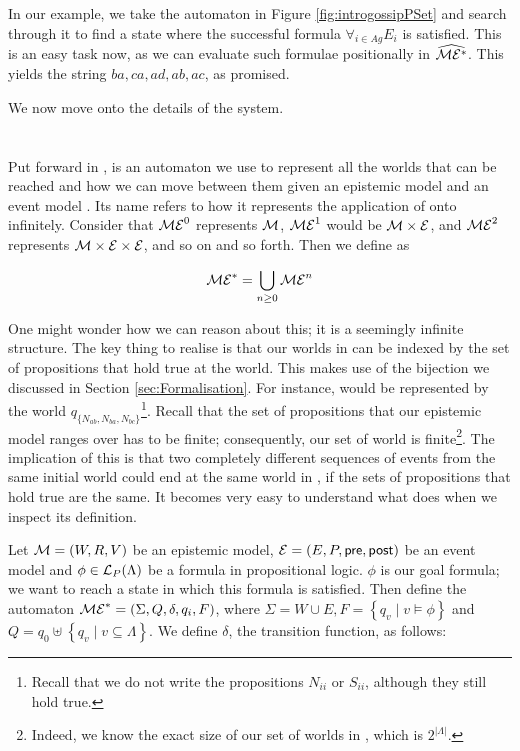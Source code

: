 \documentclass[10pt, a4paper]{report}
\begin{document}
In our example, we take the automaton in Figure \ref{fig:introgossipPSet} and
search through it to find a state where the successful formula $\forall_{i \in
  Ag} E_i$ is satisfied. This is an easy task now, as we can evaluate such
formulae positionally in $\widehat{\mathcal{ME^\ast}}$. This yields the string $ba, ca,
ad, ab, ac$, as promised.

We now move onto the details of the system.

\section{\mestar}
\label{sec:mestar}

Put forward in \cite{AutomataTechniques}, \mestar is an automaton we use to
represent all the worlds that can be reached and how we can move between them
given an epistemic model  and an event model . Its name refers to
how it represents the application of  onto  infinitely. Consider
that $\mathcal{ME}^0$ represents $\mathcal{M}$, $\mathcal{ME}^1$ would be $\mathcal{M} \times
\mathcal{E}$, and $\mathcal{ME}^2$ represents $\mathcal{M} \times \mathcal{E} \times \mathcal{E}$, and so
on and so forth. Then we define \mestar as

\begin{equation*}
  \mathcal{ME}^\ast = \bigcup_{n \geq 0} \mathcal{ME}^n
\end{equation*}

One might wonder how we can reason about this; it is a seemingly infinite
structure. The key thing to realise is that our worlds in \mestar can be indexed
by the set of propositions that hold true at the world. This makes use of the
bijection we discussed in Section \ref{sec:Formalisation}. For instance,
 would be represented by the world $q_{\{N_{ab},
  N_{ba}, N_{bc}\}}$\footnote{Recall that we do not write the propositions $N_{ii}$
  or $S_{ii}$, although they still hold true.}. Recall that the set of propositions
that our epistemic model ranges over has to be finite; consequently, our set of
world is finite\footnote{Indeed, we know the exact size of our set of worlds in
  \mestar, which is $2^{|\Lambda|}$.}. The implication of this is that two
completely different sequences of events from the same initial world could end at the
same world in \mestar, if the sets of propositions that hold true are the same.
It becomes very easy to understand what \mestar does when we inspect its
definition.

Let $\mathcal{M} = (W, R, V)$ be an epistemic model, $\mathcal{E} = (E, P, \textsf{pre},
\textsf{post})$ be an event model and $\phi \in \mathcal{L}_P(\Lambda)$ be a formula in
propositional logic. $\phi$ is our goal formula; we want to reach a state in
which this formula is satisfied. Then define the automaton $\mathcal{ME}^\ast=
(\Sigma, Q, \delta, q_i, F)$, where $\Sigma = W \cup E, F = \left\{ q_v \mid v
  \models \phi \right\}$ and $Q = q_0 \uplus \left\{ q_v \mid v \subseteq
  \Lambda \right\}$. We define $\delta$, the transition function, as follows:
\end{document}
